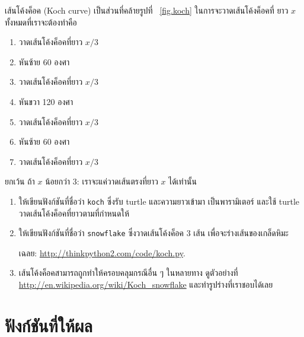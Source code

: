 \begin{exercise}

เส้นโค้งค็อค (Koch curve) เป็นส่วนที่คล้ายรูปที่ ~\ref{fig.koch} ในการจะวาดเส้นโค้งค็อคที่
ยาว {\scriptsize$x$} ทั้งหมดที่เราจะต้องทำคือ

\begin{enumerate}

\item วาดเส้นโค้งค็อคที่ยาว {\scriptsize$x/3$}

\item หันซ้าย 60 องศา

\item วาดเส้นโค้งค็อคที่ยาว {\scriptsize$x/3$}

\item หันขวา 120 องศา

\item วาดเส้นโค้งค็อคที่ยาว {\scriptsize$x/3$}

\item หันซ้าย 60 องศา

\item วาดเส้นโค้งค็อคที่ยาว {\scriptsize$x/3$}

\end{enumerate}

ยกเว้น ถ้า {\scriptsize$x$} น้อยกว่า 3: เราจะแค่วาดเส้นตรงที่ยาว {\scriptsize$x$} ได้เท่านั้น

\begin{enumerate}

\item ให้เขียนฟังก์ชันที่ชื่อว่า {\tt koch} ซึ่งรับ turtle และความยาวเข้ามา
เป็นพารามิเตอร์ และใช้ turtle วาดเส้นโค้งค็อคที่ยาวตามที่กำหนดให้

\item ให้เขียนฟังก์ชันที่ชื่อว่า {\tt snowflake} ซึ่งวาดเส้นโค้งค็อค 3 เส้น 
เพื่อจะร่างเส้นของเกล็ดหิมะ

เฉลย: \url{http://thinkpython2.com/code/koch.py}.

\item เส้นโค้งค็อคสามารถถูกทำให้ครอบคลุมกรณีอื่น ๆ ในหลายทาง ดูตัวอย่างที่
 \url{http://en.wikipedia.org/wiki/Koch_snowflake} 
 และทำรูปร่างที่เราชอบได้เลย 

\end{enumerate}
\end{exercise}



\chapter{ฟังก์ชันที่ให้ผล} %
\label{fruitchap}

